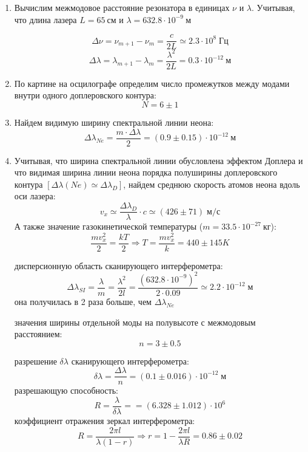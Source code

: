 \documentclass[11pt]{article}
\begin{document}
\begin{enumerate}

  \item Вычислим межмодовое расстояние резонатора в единицах \(\nu\) и \(\lambda\). Учитывая, что длина лазера \(L = 65\:см\)
и \(\lambda = 632.8\cdot 10^{-9}\:м \)

\[ \Delta\nu = \nu_{m+1} - \nu_m = \frac{c}{2L} \simeq 2.3\cdot10^8\; Гц\]
\[ \Delta\lambda = \lambda_{m+1} - \lambda_m = \frac{\lambda^2}{2L} = 0.3\cdot 10^{-12}\:м \]

  \item По картине на осцилографе определим число промежутков между модами внутри одного доплеровского контура:
\[ N = 6 \pm 1 \]

 \item Найдем видимую ширину спектральной линии неона:
\[ \Delta\lambda_{Ne} = \frac{m\cdot\Delta\lambda }{2} = \left( 0.9 \pm 0.15  \right)\cdot 10^{-12}\:м \]  

  \item Учитывая, что ширина спектральной линии обусловлена эффектом Доплера и что видимая ширина линии неона порядка полуширины доплеровского контура 
\(\left[\Delta\lambda\left(Ne\right) \simeq \Delta\lambda_D\right]\), найдем среднюю скорость атомов неона вдоль оси лазера:
\[ v_x \simeq \frac{\Delta\lambda_D}{\lambda}\cdot c \simeq \left( 426 \pm 71 \right)\; м/с \]
А также значение газокинетической температуры (\( m = 33.5\cdot 10^{-27}\: кг\)):
\[ \frac{mv_x^2}{2} = \frac{kT}{2} \Rightarrow T = \frac{mv_x^2}{k} = 440 \pm 145 K  \]

   дисперсионную область сканирующего интерферометра:
\[ \Delta\lambda_{SI} = \frac{\lambda}{m} = \frac{\lambda^2}{2l} = 
\frac{\left(632.8\cdot 10^{-9}\right)^2}{2 \cdot 0.09} \simeq 2.2\cdot 10^{-12}\;м  \]
она получилась в 2 раза больше, чем \(\Delta\lambda_{Ne}\)

   значения ширины отдельной моды на полувысоте с межмодовым расстоянием: 
\[ n = 3 \pm 0.5 \]

 разрешение \(\delta\lambda\) сканирующего интерферометра:
\[ \delta\lambda = \frac{\Delta\lambda}{n} = \left(0.1 \pm 0.016\right)\cdot 10^{-12}\;м \]
 разрешающую способность:
\[ R = \frac{\lambda}{\delta\lambda} = = \left(6.328 \pm 1.012 \right)\cdot 10^6 \]
 коэффициент отражения  зеркал интерферометра:
\[ R = \frac{2\pi l}{\lambda(1-r)} \Rightarrow r = 1 - \frac{2\pi l}{\lambda R} = 0.86 \pm 0.02  \]
\end{enumerate}
\end{document}
